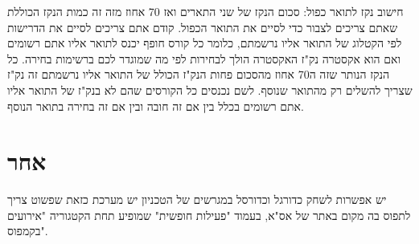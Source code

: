 \documentclass[a4paper,12pt]{article}
\begin{document}
חישוב נקז לתואר כפול: סכום הנקז של שני התארים ואז 70 אחוז מזה זה כמות הנקז הכוללת שאתם צריכים לצבור כדי לסיים את התואר הכפול. קודם אתם צריכים לסיים את הדרישות לפי הקטלוג של התואר אליו נרשמתם, כלומר כל קורס חופף יכנס לתואר אליו אתם רשומים ואם הוא אקסטרה נק"ז האקסטרה הולך לבחירות לפי מה שמוגדר לכם ברשימות בחירה. כל הנקז הנותר שזה ה70 אחוז מהסכום פחות הנק"ז הכולל של התואר אליו נרשמתם זה נק"ז שצריך להשלים רק מהתואר שנוסף. לשם נכנסים כל הקורסים שהם לא בנק"ז של התואר אליו אתם רשומים בכלל בין אם זה חובה ובין אם זה בחירה בתואר הנוסף.

\section{אחר}

יש אפשרות לשחק כדורגל וכדורסל במגרשים של הטכניון יש מערכת כזאת שפשוט צריך לתפוס בה מקום באתר של אס"א, בעמוד "פעילות חופשית" שמופיע תחת הקטגוריה "אירועים בקמפוס".
\end{document}
